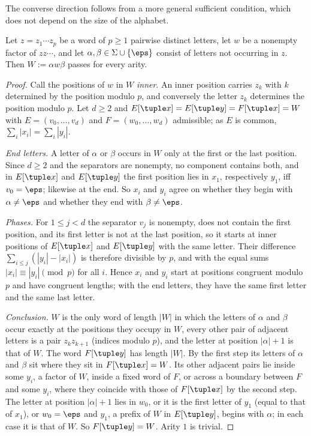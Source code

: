 The converse direction follows from a more general sufficient condition,
which does not depend on the size of the alphabet.

\begin{lemma}
\label{lem:app-singleton-periodic}
Let $z=z_1\cdots z_p$ be a word of $p\ge1$ pairwise distinct letters, let $w$ be a
nonempty factor of $zz\cdots$, and let $\alpha,\beta\in\Sigma\cup\{\eps\}$ consist of
letters not occurring in $z$.  Then $W:=\alpha w\beta$ passes for every arity.
\end{lemma}

\begin{proof}
Call the positions of $w$ in $W$ \emph{inner}.  An inner position carries $z_k$
with $k$ determined by the position modulo $p$, and conversely the letter $z_k$
determines the position modulo $p$.  Let $d\ge2$ and
$E[\tuple x]=E[\tuple y]=F[\tuple x]=W$ with $E=(v_0,\ldots,v_d)$ and
$F=(w_0,\ldots,w_d)$ admissible; as $E$ is common,
$\sum_i|x_i|=\sum_i|y_i|$.

\emph{End letters.}  A letter of $\alpha$ or $\beta$ occurs in $W$ only at the
first or the last position.  Since $d\ge2$ and the separators are nonempty, no
component contains both, and in $E[\tuple x]$ and $E[\tuple y]$ the first
position lies in $x_1$, respectively $y_1$, iff $v_0=\eps$; likewise at the end.
So $x_i$ and $y_i$ agree on whether they begin with $\alpha\ne\eps$ and whether
they end with $\beta\ne\eps$.

\emph{Phases.}  For $1\le j<d$ the separator $v_j$ is nonempty, does not
contain the first position, and its first letter is not at the last position, so
it starts at inner positions of $E[\tuple x]$ and $E[\tuple y]$ with the same
letter.  Their difference $\sum_{i\le j}(|y_i|-|x_i|)$ is therefore divisible by
$p$, and with the equal sums $|x_i|\equiv|y_i|\pmod p$ for all $i$.  Hence $x_i$
and $y_i$ start at positions congruent modulo $p$ and have congruent lengths; with
the end letters, they have the same first letter and the same last letter.

\emph{Conclusion.}  $W$ is the only word of length $|W|$ in which the letters of
$\alpha$ and $\beta$ occur exactly at the positions they occupy in $W$, every
other pair of adjacent letters is a pair $z_kz_{k+1}$ (indices modulo $p$), and
the letter at position $|\alpha|+1$ is that of $W$.  The word $F[\tuple y]$ has
length $|W|$.  By the first step its letters of $\alpha$ and $\beta$ sit where
they sit in $F[\tuple x]=W$.  Its other adjacent pairs lie inside some $y_i$, a
factor of $W$, inside a fixed word of $F$, or across a boundary between $F$ and
some $y_i$, where they coincide with those of $F[\tuple x]$ by the second step.
The letter at position $|\alpha|+1$ lies in $w_0$, or it is the first letter of
$y_1$ (equal to that of $x_1$), or $w_0=\eps$ and $y_1$, a prefix of $W$ in
$E[\tuple y]$, begins with $\alpha$; in each case it is that of $W$.  So
$F[\tuple y]=W$.  Arity $1$ is trivial.
\end{proof}

